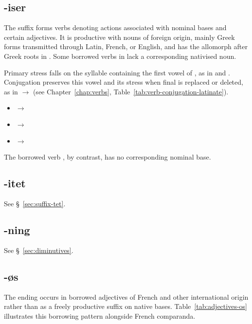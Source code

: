 \subsection{-iser}

\label{sec:suffix-iser}

The suffix  forms verbs denoting actions associated with nominal bases and certain adjectives. It is productive with nouns of foreign origin, mainly Greek forms transmitted through Latin, French, or English, and has the allomorph  after Greek roots in . Some borrowed verbs in  lack a corresponding nativised noun.

Primary stress falls on the syllable containing the first vowel of , as in  and . Conjugation preserves this vowel and its stress when final  is replaced or deleted, as in  $\rightarrow$  (see Chapter~\ref{chap:verbs}, Table~\ref{tab:verb-conjugation-latinate}).

\begin{itemize}
    \item {} $\rightarrow$ 
    \item {} $\rightarrow$ 
    \item {} $\rightarrow$ 
\end{itemize}

The borrowed verb , by contrast, has no corresponding nominal base.

\subsection{-itet}

See \S~\ref{sec:suffix-tet}.

\subsection{-ning}

See \S~\ref{sec:diminutives}.

\subsection{-øs}
\label{sec:ending-os}

The ending  occurs in borrowed adjectives of French and other international origin rather than as a freely productive suffix on native bases. Table~\ref{tab:adjectives-os} illustrates this borrowing pattern alongside French comparanda.


